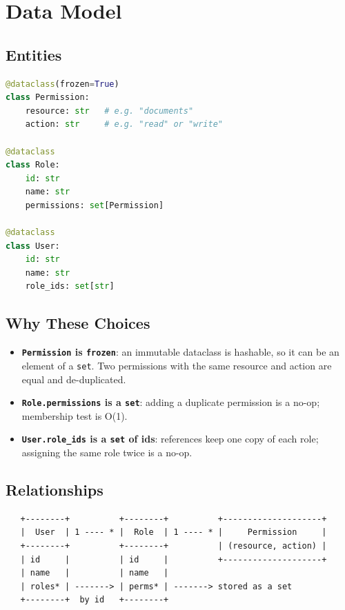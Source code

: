 \documentclass[11pt,a4paper]{report}
\begin{document}
\chapter{Data Model}

\section{Entities}

\begin{lstlisting}[language=Python]
@dataclass(frozen=True)
class Permission:
    resource: str   # e.g. "documents"
    action: str     # e.g. "read" or "write"

@dataclass
class Role:
    id: str
    name: str
    permissions: set[Permission]

@dataclass
class User:
    id: str
    name: str
    role_ids: set[str]
\end{lstlisting}

\section{Why These Choices}

\begin{itemize}[leftmargin=1.4em]
  \item \textbf{\texttt{Permission} is \texttt{frozen}}: an immutable dataclass
        is hashable, so it can be an element of a \texttt{set}. Two permissions
        with the same resource and action are equal and de-duplicated.
  \item \textbf{\texttt{Role.permissions} is a \texttt{set}}: adding a duplicate
        permission is a no-op; membership test is O(1).
  \item \textbf{\texttt{User.role\_ids} is a \texttt{set} of ids}: references
        keep one copy of each role; assigning the same role twice is a no-op.
\end{itemize}

\section{Relationships}

\begin{verbatim}
   +--------+          +--------+          +--------------------+
   |  User  | 1 ---- * |  Role  | 1 ---- * |     Permission     |
   +--------+          +--------+          | (resource, action) |
   | id     |          | id     |          +--------------------+
   | name   |          | name   |
   | roles* | -------> | perms* | -------> stored as a set
   +--------+  by id   +--------+
\end{verbatim}
\end{document}
